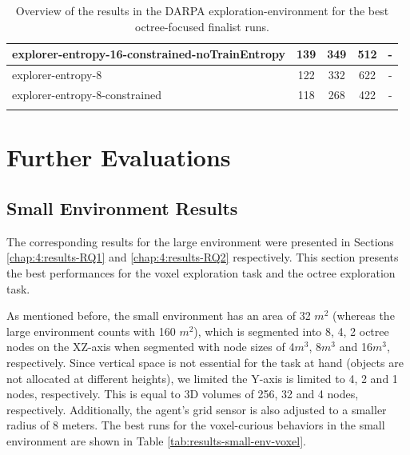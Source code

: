 \begin{longtable}{|l|c|c|c|c|}
explorer-entropy-16-constrained-noTrainEntropy & {\cellcolor[HTML]{55AA99}} \color[HTML]{000000} 139 & {\cellcolor[HTML]{8CC5B9}} \color[HTML]{000000} 349 & {\cellcolor[HTML]{AAD3CA}} \color[HTML]{000000} 512 &    -     \\ \hline
explorer-entropy-8 & {\cellcolor[HTML]{55AA99}} \color[HTML]{000000} 122 & {\cellcolor[HTML]{88C2B6}} \color[HTML]{000000} 332 & {\cellcolor[HTML]{C3DFD9}} \color[HTML]{000000} 622 &    -     \\ \hline
explorer-entropy-8-constrained & {\cellcolor[HTML]{55AA99}} \color[HTML]{000000} 118 & {\cellcolor[HTML]{76BAAC}} \color[HTML]{000000} 268 & {\cellcolor[HTML]{95C9BE}} \color[HTML]{000000} 422 &    -     \\ \hline

    \caption{Overview of the results in the DARPA exploration-environment for the best octree-focused finalist runs.}
    \label{tab:results-evaluation-framework}
\end{longtable}



\newpage
\section{Further Evaluations}
\subsection{Small Environment Results}\label{chap-4:small-env-results}
The corresponding results for the large environment were presented in Sections \ref{chap:4:results-RQ1} and \ref{chap:4:results-RQ2} respectively. 
This section presents the best performances for the voxel exploration task and the octree exploration task. 

As mentioned before, the small environment has an area of 32 $m^2$ (whereas the large environment counts with 160 $m^2$), which is segmented into 8, 4, 2 octree nodes on the XZ-axis when segmented with node sizes of 4$m^3$, 8$m^3$ and 16$m^3$, respectively.
Since vertical space is not essential for the task at hand (objects are not allocated at different heights), we limited the Y-axis is limited to 4, 2 and 1 nodes, respectively. 
This is equal to 3D volumes of 256, 32 and 4 nodes, respectively. 
Additionally, the agent’s grid sensor is also adjusted to a smaller radius of 8 meters.
The best runs for the voxel-curious behaviors in the small environment are shown in Table \ref{tab:results-small-env-voxel}.

